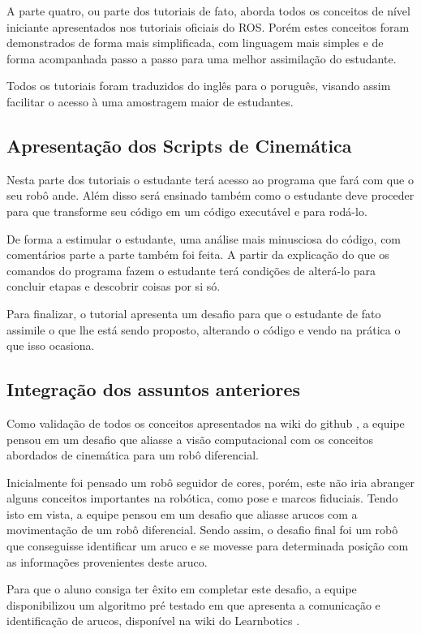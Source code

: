 A parte quatro, ou parte dos tutoriais de fato, aborda todos os conceitos de nível iniciante apresentados nos tutoriais oficiais do ROS. Porém estes conceitos foram demonstrados de forma mais simplificada, com linguagem mais simples e de forma acompanhada passo a passo para uma melhor assimilação do estudante.

Todos os tutoriais foram traduzidos do inglês para o poruguês, visando assim facilitar o acesso à uma amostragem maior de estudantes. \cite{tutROS}

\subsection{Apresentação dos Scripts de Cinemática}
Nesta parte dos tutoriais o estudante terá acesso ao programa que fará com que o seu robô ande. Além disso será ensinado também como o estudante deve proceder para que transforme seu código em um código executável e para rodá-lo.

De forma a estimular o estudante, uma análise mais minusciosa do código, com comentários parte a parte também foi feita. A partir da explicação do que os comandos do programa fazem o estudante terá condições de alterá-lo para concluir etapas e descobrir coisas por si só.

Para finalizar, o tutorial apresenta um desafio para que o estudante de fato assimile o que lhe está sendo proposto, alterando o código e vendo na prática o que isso ocasiona. \cite{tutCinemat}

\subsection{Integração dos assuntos anteriores}
Como validação de todos os conceitos apresentados na wiki do github \cite{wikilearn}, a equipe pensou em um desafio que aliasse a visão computacional com os conceitos abordados de cinemática para um robô diferencial. 

Inicialmente foi pensado um robô seguidor de cores, porém, este não iria abranger alguns conceitos importantes na robótica, como pose e marcos fiduciais. Tendo isto em vista, a equipe pensou em um desafio que aliasse arucos com a movimentação de um robô diferencial. Sendo assim, o desafio final foi um robô que conseguisse identificar um aruco e se movesse para determinada posição com as informações provenientes deste aruco.

Para que o aluno consiga ter êxito em completar este desafio, a equipe disponibilizou um algoritmo pré testado em que apresenta a comunicação e identificação de arucos, disponível na wiki do Learnbotics \cite{tutFin}.


